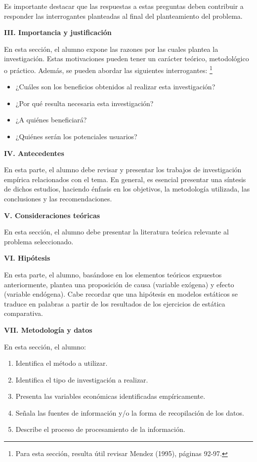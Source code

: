 \documentclass[
  letterpaper,
  DIV=11,
  numbers=noendperiod]{scrartcl}
\providecommand{\tightlist}{%
  \setlength{\itemsep}{0pt}\setlength{\parskip}{0pt}}\usepackage{longtable,booktabs,array}
\begin{document}
Es importante destacar que las respuestas a estas preguntas deben
contribuir a responder las interrogantes planteadas al final del
planteamiento del problema.

\textbf{III. Importancia y justificación}

En esta sección, el alumno expone las razones por las cuales plantea la
investigación. Estas motivaciones pueden tener un carácter teórico,
metodológico o práctico. Además, se pueden abordar las siguientes
interrogantes: \footnote{Para esta sección, resulta útil revisar Mendez
  (1995), páginas 92-97.}

\begin{itemize}
\tightlist
\item
  ¿Cuáles son los beneficios obtenidos al realizar esta investigación?
\item
  ¿Por qué resulta necesaria esta investigación?
\item
  ¿A quiénes beneficiará?
\item
  ¿Quiénes serán los potenciales usuarios?
\end{itemize}

\textbf{IV. Antecedentes}

En esta parte, el alumno debe revisar y presentar los trabajos de
investigación empírica relacionados con el tema. En general, es esencial
presentar una síntesis de dichos estudios, haciendo énfasis en los
objetivos, la metodología utilizada, las conclusiones y las
recomendaciones.

\textbf{V. Consideraciones teóricas}

En esta sección, el alumno debe presentar la literatura teórica
relevante al problema seleccionado.

\textbf{VI. Hipótesis}

En esta parte, el alumno, basándose en los elementos teóricos expuestos
anteriormente, plantea una proposición de causa (variable exógena) y
efecto (variable endógena). Cabe recordar que una hipótesis en modelos
estáticos se traduce en palabras a partir de los resultados de los
ejercicios de estática comparativa.

\textbf{VII. Metodología y datos}

En esta sección, el alumno:

\begin{enumerate}
\def\labelenumi{\arabic{enumi}.}
\tightlist
\item
  Identifica el método a utilizar.
\item
  Identifica el tipo de investigación a realizar.
\item
  Presenta las variables económicas identificadas empíricamente.
\item
  Señala las fuentes de información y/o la forma de recopilación de los
  datos.
\item
  Describe el proceso de procesamiento de la información.
\end{enumerate}
\end{document}
